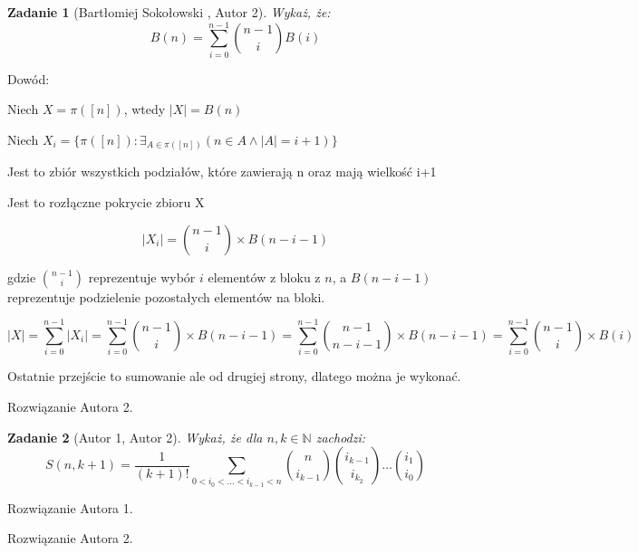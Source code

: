 \documentclass{mwart}
\newtheorem{zad}{Zadanie}[section]
\begin{document}
\begin{zad}[Bartłomiej Sokołowski , Autor 2]
    Wykaż, że:
    \[B(n) = \sum_{i=0}^{n-1} \binom{n-1}{i}B(i)\]
\end{zad}
\begin{mdframed}
    \item Dowód:
    \item Niech $X = \pi([n])$, wtedy $|X| = B(n)$
    \item Niech $X_i = \{\pi([n]) : \exists_{A \in \pi([n])} (n \in A \land |A| = i + 1)\}$
    \item Jest to zbiór wszystkich podziałów, które zawierają n oraz mają wielkość i+1
    \item Jest to rozłączne pokrycie zbioru X 
    \item \[ |X_i| = \binom{n-1}{i} \times B(n-i-1)\]
    \item gdzie $\binom{n-1}{i}$ reprezentuje wybór $i$ elementów z bloku z $n$, a $B(n-i-1)$ reprezentuje podzielenie pozostałych elementów na bloki.
    \item \[ |X| = \sum_{i=0}^{n-1} |X_i| = \sum_{i=0}^{n-1}\binom{n-1}{i} \times B(n-i-1) = \sum_{i=0}^{n-1} \binom{n-1}{n-i-1} \times B(n-i-1) = \sum_{i=0}^{n-1} \binom{n-1}{i} \times B(i)\]
    \item Ostatnie przejście to sumowanie ale od drugiej strony, dlatego można je wykonać.
\end{mdframed}
\begin{mdframed}
    Rozwiązanie Autora 2.
\end{mdframed}




\begin{zad}[Autor 1, Autor 2]
    Wykaż, że dla $n, k \in \mathbb{N}$ zachodzi:
    \[S(n,k+1)=\frac{1}{(k+1)!} \sum_{0<i_0<...<i_{k-1}<n} \binom{n}{i_{k-1}}\binom{i_{k-1}}{i_{k_2}}...\binom{i_1}{i_0}     \]
\end{zad}
\begin{mdframed}
    Rozwiązanie Autora 1.
\end{mdframed}
\begin{mdframed}
    Rozwiązanie Autora 2.
\end{mdframed}
\end{document}
